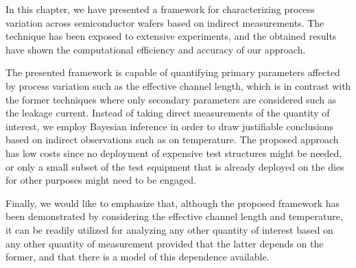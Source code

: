 In this chapter, we have presented a framework for characterizing process
variation across semiconductor wafers based on indirect measurements. The
technique has been exposed to extensive experiments, and the obtained results
have shown the computational efficiency and accuracy of our approach.

The presented framework is capable of quantifying primary parameters affected by
process variation such as the effective channel length, which is in contrast
with the former techniques where only secondary parameters are considered such
as the leakage current. Instead of taking direct measurements of the quantity of
interest, we employ Bayesian inference in order to draw justifiable conclusions
based on indirect observations such as on temperature. The proposed approach has
low costs since no deployment of expensive test structures might be needed, or
only a small subset of the test equipment that is already deployed on the dies
for other purposes might need to be engaged.

Finally, we would like to emphasize that, although the proposed framework has
been demonstrated by considering the effective channel length and temperature,
it can be readily utilized for analyzing any other quantity of interest based on
any other quantity of measurement provided that the latter depends on the
former, and that there is a model of this dependence available.
